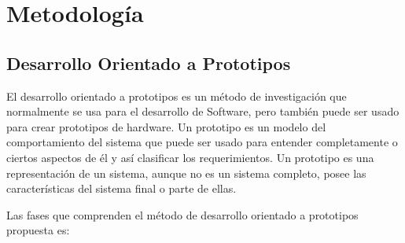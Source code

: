 
\chapter{Metodolog\'{i}a} %



\ifpdf
    \graphicspath{{3/figures/PNG/}{3/figures/PDF/}{3/figures/}}
\else
    \graphicspath{{3/figures/EPS/}{3/figures/}}
\fi


\section{Desarrollo Orientado a Prototipos}

El desarrollo orientado a prototipos es un m\'{e}todo de investigaci\'{o}n que normalmente se usa para el desarrollo de Software, pero tambi\'{e}n puede ser usado para crear prototipos de hardware. Un prototipo es un modelo del comportamiento del sistema que puede ser usado para entender completamente o ciertos aspectos de \'{e}l y as\'{i} clasificar los requerimientos. Un prototipo es una representaci\'{o}n de un sistema, aunque no es un sistema completo, posee las caracter\'{i}sticas del sistema final o parte de ellas.

Las fases que comprenden el m\'{e}todo de desarrollo orientado a prototipos propuesta es:
























